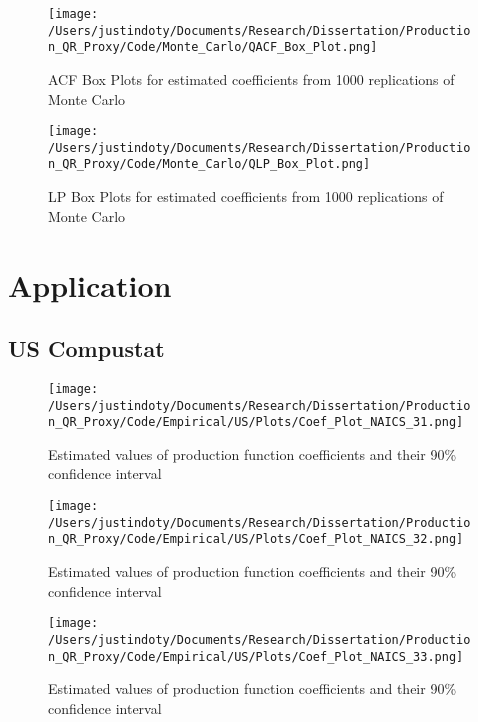 \documentclass[11pt]{article}
\begin{document}
\begin{figure}[H]
\centering
\caption{ACF Box Plots for estimated coefficients from 1000 replications of Monte Carlo}
\texttt{[image: /Users/justindoty/Documents/Research/Dissertation/Production\_QR\_Proxy/Code/Monte\_Carlo/QACF\_Box\_Plot.png]}
\label{ACF_Box Plot}
\end{figure}

\begin{figure}[H]
\centering
\caption{LP Box Plots for estimated coefficients from 1000 replications of Monte Carlo}
\texttt{[image: /Users/justindoty/Documents/Research/Dissertation/Production\_QR\_Proxy/Code/Monte\_Carlo/QLP\_Box\_Plot.png]}
\label{LP_Box Plot}
\end{figure}

\section{Application}

\subsection{US Compustat}




\begin{figure}[H]
\centering
\caption{Estimated values of production function coefficients and their 90\% confidence interval}
\texttt{[image: /Users/justindoty/Documents/Research/Dissertation/Production\_QR\_Proxy/Code/Empirical/US/Plots/Coef\_Plot\_NAICS\_31.png]}
\end{figure}

\begin{figure}[H]
\centering
\caption{Estimated values of production function coefficients and their 90\% confidence interval}
\texttt{[image: /Users/justindoty/Documents/Research/Dissertation/Production\_QR\_Proxy/Code/Empirical/US/Plots/Coef\_Plot\_NAICS\_32.png]}
\end{figure}

\begin{figure}[H]
\centering
\caption{Estimated values of production function coefficients and their 90\% confidence interval}
\texttt{[image: /Users/justindoty/Documents/Research/Dissertation/Production\_QR\_Proxy/Code/Empirical/US/Plots/Coef\_Plot\_NAICS\_33.png]}
\end{figure}
\end{document}
